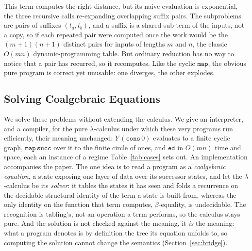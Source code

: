 This term computes the right distance, but its naive evaluation is exponential, the three recursive calls re-expanding overlapping suffix pairs. The subproblems are pairs of suffixes $(t_a,t_b)$, and a suffix is a shared sub-term of the inputs, not a copy, so if each repeated pair were computed once the work would be the $(m{+}1)(n{+}1)$ distinct pairs for inputs of lengths $m$ and $n$, the classic $O(mn)$ dynamic-programming table. But ordinary reduction has no way to notice that a pair has recurred, so it recomputes. Like the cyclic $\mathtt{map}$, the obvious pure program is correct yet unusable: one diverges, the other explodes.

\subsection{Solving Coalgebraic Equations}

We solve these problems without extending the calculus. We give an interpreter, and a compiler, for the pure $\lambda$-calculus under which these very programs run efficiently, their meaning unchanged: $Y\,(\mathtt{cons}\,0)$ evaluates to a finite cyclic graph, $\mathtt{map}\,\mathtt{succ}$ over it to the finite circle of ones, and $\mathtt{ed}$ in $O(mn)$ time and space, each an instance of a regime Table~\ref{tab:cases} sets out. An implementation accompanies the paper. The one idea is to read a program as a \emph{coalgebraic equation}, a state exposing one layer of data over its successor states, and let the $\lambda$-calculus be its \emph{solver}: it tables the states it has seen and folds a recurrence on the decidable structural identity of the term a state is built from, whereas the only identity on the function that term computes, $\beta$-equality, is undecidable. The recognition is tabling's, not an operation a term performs, so the calculus stays pure. And the solution is not checked against the meaning, it \emph{is} the meaning: what a program denotes is by definition the tree its equation unfolds to, so computing the solution cannot change the semantics (Section~\ref{sec:bridge}).


